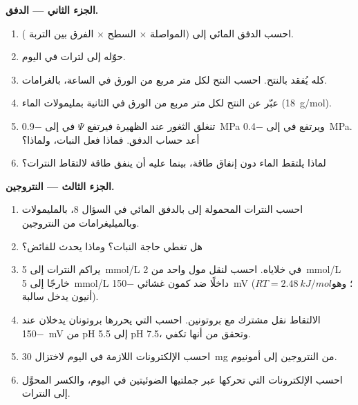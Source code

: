 \begin{problem}
\medskip
\noindent\textbf{الجزء الثاني --- الدفق.}
\begin{enumerate}[resume]
  \item احسب الدفق المائي إلى  (المواصلة $\times$
        السطح $\times$ الفرق بين التربة  ).
  \item حوّله إلى لترات في اليوم.
  \item كله يُفقد بالنتح. احسب النتح لكل متر مربع من الورق في
        الساعة، بالغرامات.
  \item عبّر عن النتح لكل متر مربع من الورق في الثانية بمليمولات
        الماء (\qty{18}{g/mol}).
  \item تنغلق الثغور عند الظهيرة فيرتفع $\Psi$ في  إلى
        \qty{-0.9}{MPa} ويرتفع في  إلى \qty{-0.4}{MPa}.
        أعد حساب الدفق. فماذا فعل النبات، ولماذا؟
  \item لماذا يلتقط  الماء دون إنفاق طاقة، بينما عليه أن ينفق
        طاقة لالتقاط النترات؟
\end{enumerate}

\medskip
\noindent\textbf{الجزء الثالث --- النتروجين.}
\begin{enumerate}[resume]
  \item احسب النترات المحمولة إلى  بالدفق المائي في السؤال 8،
        بالمليمولات وبالميليغرامات من النتروجين.
  \item هل تغطي حاجة النبات؟ وماذا يحدث للفائض؟
  \item يراكم  النترات إلى \qty{5}{mmol/L} في خلاياه. احسب
         لنقل مول واحد من \qty{2}{mmol/L} خارجًا إلى
        \qty{5}{mmol/L} داخلًا ضد كمون غشائي \qty{-150}{mV}
        ($RT = \qty{2.48}{kJ/mol}$؛ وهو أنيون يدخل  سالبة).
  \item الالتقاط نقل مشترك مع بروتونين. احسب  التي
        يحررها بروتونان يدخلان  عند \qty{-150}{mV} من pH 5.5
        إلى pH 7.5، وتحقق من أنها تكفي.
  \item احسب الإلكترونات اللازمة في اليوم لاختزال \qty{30}{mg} من
        النتروجين إلى أمونيوم.
  \item احسب الإلكترونات التي تحركها  عبر جملتيها الضوئيتين
        في اليوم، والكسر المحوَّل إلى النترات.
\end{enumerate}


\end{problem}
